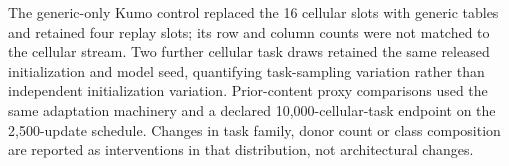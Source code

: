 The generic-only Kumo control replaced the 16 cellular slots with generic tables and retained four replay slots; its row and column counts were not matched to the cellular stream. Two further cellular task draws retained the same released initialization and model seed, quantifying task-sampling variation rather than independent initialization variation. Prior-content proxy comparisons used the same adaptation machinery and a declared 10,000-cellular-task endpoint on the 2,500-update schedule. Changes in task family, donor count or class composition are reported as interventions in that distribution, not architectural changes.
